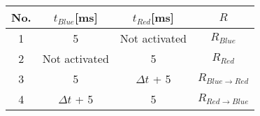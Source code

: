 {{{       \begin{table}[H]
         \begin{center}
           \begin{tabular}[H]{|c||c|c||c|} \hline
             No. & $t_{Blue}$[ms] & $t_{Red}$[ms] & $R$ \\ \hline \hline
             1 & 5 & Not activated & $R_{Blue}$\\ \hline
             2 & Not activated & 5 & $R_{Red}$\\ \hline
             3 & 5 & ${\Delta}t$ + 5 & $R_{Blue \to Red}$\\ \hline
             4 & ${\Delta}t$ + 5 & 5 & $R_{Red \to Blue}$\\ \hline
           \end{tabular}
         \end{center}
       \end{table}

}}}
